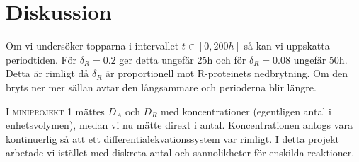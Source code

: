 \section{Diskussion}
\label{sec:diskussion}

Om vi undersöker topparna i intervallet $t \in [0, 200h]$ så kan vi uppskatta periodtiden. För $\delta_R = 0.2$ ger detta ungefär 25h och för $\delta_R = 0.08$ ungefär 50h. Detta är rimligt då $\delta_R$ är proportionell mot R-proteinets nedbrytning. Om den bryts ner mer sällan avtar den långsammare och perioderna blir längre.

I \textsc{miniprojekt 1} mättes $D_A$ och $D_R$ med koncentrationer (egentligen antal i enhetsvolymen), medan vi nu mätte direkt i antal. Koncentrationen antogs vara kontinuerlig så att ett differentialekvationssystem var rimligt. I detta projekt arbetade vi istället med diskreta antal och sannolikheter för enskilda reaktioner.